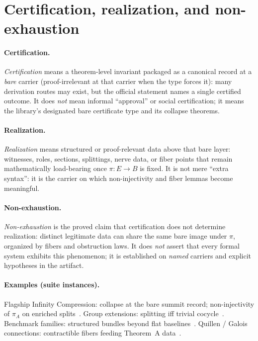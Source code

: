 \documentclass[11pt]{article}
\begin{document}
\section{Certification, realization, and non-exhaustion}

\paragraph{Certification.}
\emph{Certification} means a theorem-level invariant packaged as a canonical record at a
\emph{bare} carrier (proof-irrelevant at that carrier when the type forces it): many
derivation routes may exist, but the official statement names a single certified outcome.
It does \emph{not} mean informal ``approval'' or social certification; it means the
library's designated bare certificate type and its collapse theorems.

\paragraph{Realization.}
\emph{Realization} means structured or proof-relevant data above that bare layer: witnesses,
roles, sections, splittings, nerve data, or fiber points that remain mathematically
load-bearing once $\pi : E \to B$ is fixed. It is not mere ``extra syntax'': it is the
carrier on which non-injectivity and fiber lemmas become meaningful.

\paragraph{Non-exhaustion.}
\emph{Non-exhaustion} is the proved claim that certification does not determine realization:
distinct legitimate data can share the same bare image under $\pi$, organized by fibers and
obstruction laws. It does \emph{not} assert that every formal system exhibits this
phenomenon; it is established on \emph{named} carriers and explicit hypotheses in the
artifact.

\paragraph{Examples (suite instances).}
Flagship Infinity Compression: collapse at the bare summit record; non-injectivity of
$\pi_A$ on enriched splits~\cite{SpivackIC}. Group extensions: splitting iff trivial
cocycle~\cite{SpivackFiber}. Benchmark families: structured bundles beyond flat
baselines~\cite{SpivackValidation}. Quillen / Galois connections: contractible fibers
feeding Theorem~A data~\cite{SpivackQuillen}.
\end{document}
